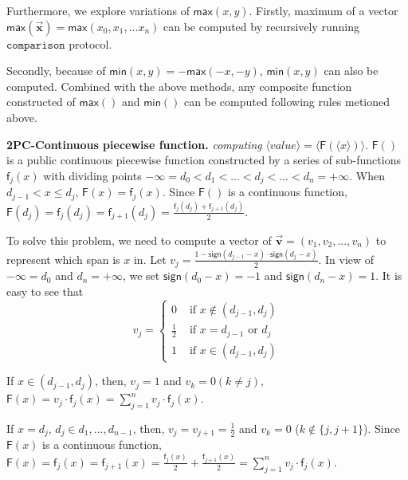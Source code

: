 \documentclass[letterpaper]{article} %
\begin{document}
    Furthermore, we explore variations of $\mathsf{max}(x,y)$.
    Firstly, maximum of a vector $\mathsf{max}(\overrightarrow{\mathbf{x}})=\mathsf{max}(x_{0},x_{1},...x_{n})$
    can be computed by recursively running $\mathtt{comparison}$ protocol.


    Secondly, because of $\mathsf{min}(x,y)=-\mathsf{max}(-x,-y)$,  $\mathsf{min}(x,y)$ can also be computed.
    Combined with the above methods,
    any composite function constructed of $\mathsf{max}()$ and $\mathsf{min}()$ can be computed following rules metioned above.

    \textbf{2PC-Continuous piecewise function.}
    \emph{computing}
    $\langle value\rangle  = \langle \mathsf{F}(\langle x\rangle)\rangle $.
    $\mathsf{F}()$ is a public continuous piecewise function constructed by a series of sub-functions $\mathsf{f}_{j}(x)$
    with dividing points $-\infty =d_{0}<d_{1}<...<d_{j}<...<d_{n}=+\infty$.
    When $d_{j-1}< x\leq d_{j}$, $\mathsf{F}(x) =\mathsf{f}_{j}(x)$.
    Since $\mathsf{F}()$ is a continuous function, $\mathsf{F}(d_{j}) =\mathsf{f}_{j}(d_{j})=\mathsf{f}_{j+1}(d_{j})=\frac{\mathsf{f}_{j}(d_{j})+\mathsf{f}_{j+1}(d_{j})}{2}$.


    To solve this problem, we need to compute a vector of
    $\overrightarrow{\textbf{v}}=(v_{1},v_{2},...,v_{n})$ to represent which span is $x$ in.
    Let $v_{j} = \frac{1-\mathsf{sign}(d_{j-1}-x)\cdot \mathsf{sign}(d_{j}-x)}{2}$.
    In view of $-\infty =d_{0}$ and $d_{n}=+\infty$,
    we set $\mathsf{sign}(d_{0}-x)=-1$ and $\mathsf{sign}(d_{n}-x)=1$.
    It is easy to see that
    $$v_{j}=\begin{cases}
        0 & \text{ if } x\notin (d_{j-1},d_{j}) \\
        \frac{1}{2} & \text{ if } x = d_{j-1} \text{ or } d_{j}\\
        1 & \text{ if } x\in (d_{j-1},d_{j})
        \end{cases}$$

    If $x\in (d_{j-1},d_{j})$, then, $v_{j}=1$ and $v_{k}=0 (k\neq j)$, $\mathsf{F}(x)=v_{j}\cdot \mathsf{f}_{j}(x)=\sum_{j=1}^{n}v_{j}\cdot \mathsf{f}_{j}(x)$.

    If $x=d_{j} $, $ d_{j}\in {d_{1},...,d_{n-1}}$,
    then, $v_{j}=v_{j+1}=\frac{1}{2}$ and $v_{k}=0$ ($ k\notin \{j,j+1\}$).
    Since $\mathsf{F}(x)$ is a continuous function,
    $\mathsf{F}(x)=\mathsf{f}_{j}(x)=\mathsf{f}_{j+1}(x)=\frac{\mathsf{f}_{j}(x)}{2}+\frac{\mathsf{f}_{j+1}(x)}{2}=\sum_{j=1}^{n}v_{j}\cdot \mathsf{f}_{j}(x)$.
\end{document}
